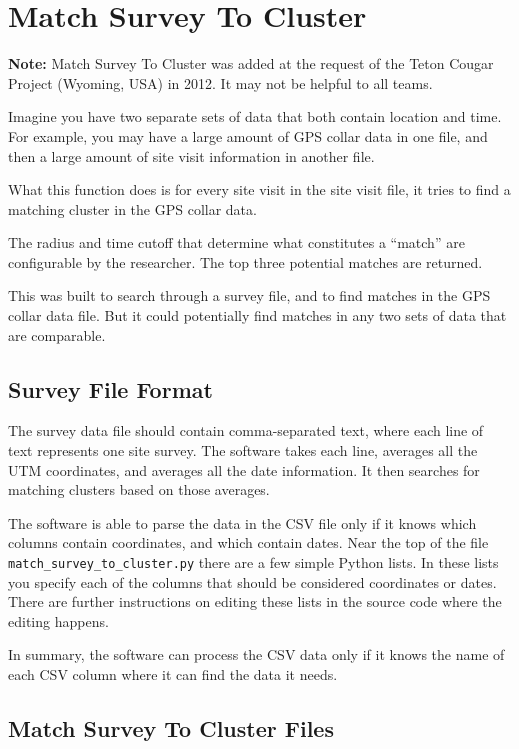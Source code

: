 \chapter{Match Survey To Cluster}
\hypertarget{match-survey-to-cluster}{}

\textbf{Note:} Match Survey To Cluster was added at the request
of the Teton Cougar Project (Wyoming, USA) in 2012. It may not
be helpful to all teams.

Imagine you have two separate sets of data that both contain
location and time. For example, you may have a large amount of GPS
collar data in one file, and then a large amount of site visit
information in another file.

What this function does is for every site visit in the site visit
file, it tries to find a matching cluster in the GPS collar data.

The radius and time cutoff that determine what constitutes a 
``match'' are configurable by the researcher. The top three potential
matches are returned.

This was built to search through a survey file, and to find
matches in the GPS collar data file. But it could potentially find
matches in any two sets of data that are comparable.

\section{Survey File Format}

The survey data file should contain comma-separated text, where each
line of text represents one site survey. The software takes each line,
averages all the UTM coordinates, and averages all the date
information. It then searches for matching clusters based on those
averages.

The software is able to parse the data in the CSV file only if it
knows which columns contain coordinates, and which contain dates. Near
the top of the file \texttt{match\_survey\_to\_cluster.py} there are a few
simple Python lists. In these lists you specify each of the columns
that should be considered coordinates or dates. There are further
instructions on editing these lists in the source code where the
editing happens.

In summary, the software can process the CSV data only if it knows the
name of each CSV column where it can find the data it needs.

\section{Match Survey To Cluster Files}

